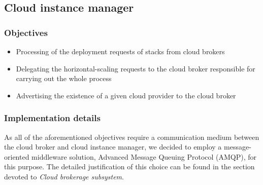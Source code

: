 \subsection{Cloud instance manager}

\subsubsection{Objectives}
\begin{itemize}
  \item Processing of the deployment requests of stacks from cloud brokers
  \item Delegating the horizontal-scaling requests to the cloud broker responsible for carrying out the whole process
  \item Advertising the existence of a given cloud provider to the cloud broker
\end{itemize}

\subsubsection{Implementation details}
As all of the aforementioned objectives require a communication medium between the cloud broker and cloud instance manager, we decided to employ a message-oriented middleware solution, Advanced Message Queuing Protocol (AMQP), for this purpose. The detailed justification of this choice can be found in the section devoted to \emph{Cloud brokerage subsystem}.  

